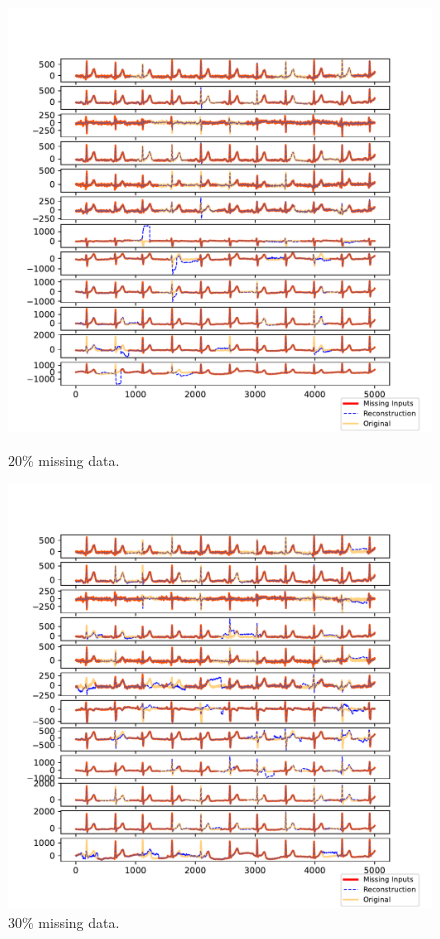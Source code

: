 \documentclass{mldsmsc}
\begin{document}
\begin{figure}[H]
\centering
\begin{minipage}{0.4\linewidth}
    \centering
    \includegraphics[width=\linewidth]{images/missing/rpsmf_output_20_10.pdf}
    \caption{$20\%$ missing data.}
\end{minipage}%
\hspace{0.05\linewidth}
\begin{minipage}{0.4\linewidth}
    \centering
    \includegraphics[width=\linewidth]{images/missing/rpsmf_output_30_10.pdf}
    \caption{$30\%$ missing data.}
\end{minipage}


\end{figure}
\end{document}
